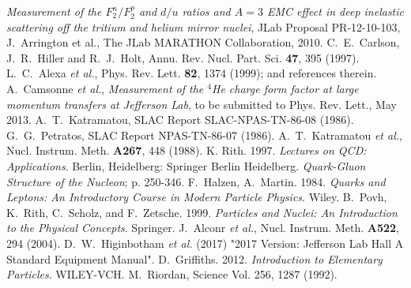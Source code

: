 

\vskip-0.6in
 {\it Measurement of the $F_2^n/F_2^p$ and $d/u$ ratios and $A=3$ EMC
effect in deep inelastic scattering off the tritium and helium mirror nuclei},
JLab Proposal PR-12-10-103, J.~Arrington et al., The JLab MARATHON Collaboration, 2010.
 C.~E.~Carlson, J.~R.~Hiller and R.~J.~Holt, Annu. Rev. Nucl.
               Part. Sci. {\bf 47}, 395 (1997).
 L.~C.~Alexa {\it et al.}, Phys. Rev. Lett. {\bf 82},
               1374 (1999); and references therein.
 A.~Camsonne {\it et al.}, {\it Measurement of the $^4$He charge
               form factor at large momentum transfers at Jefferson Lab}, to be
               submitted to Phys. Rev. Lett., May 2013.
 A.~T.~Katramatou, SLAC Report SLAC-NPAS-TN-86-08 (1986).      
 G.~G.~Petratos, SLAC Report NPAS-TN-86-07 (1986).
 A.~T.~Katramatou {\it et al.},
               Nucl. Instrum. Meth. {\bf A267}, 448 (1988).
 K. Rith. 1997. \textit{Lectures on QCD: Applications}. Berlin, Heidelberg: Springer Berlin Heidelberg. \textit{Quark-Gluon Structure of the Nucleon}; p. 250-346.
 F.~Halzen, A.~Martin. 1984. \textit{Quarks and Leptons: An Introductory Course in Modern Particle Physics}. Wiley.
 B.~Povh, K.~Rith, C.~Scholz, and F.~Zetsche. 1999. \textit{Particles and Nuclei: An Introduction to the Physical Concepts}. Springer.
 J.~Alconr {\it et al.}, Nucl. Instrum. Meth. {\bf A522}, 294 (2004).
 D.~W.~Higinbotham {\it et al.} (2017) "2017 Version: Jefferson Lab Hall A
Standard Equipment Manual".
 D.~Griffiths. 2012. \textit{Introduction to Elementary Particles}. WILEY-VCH.
 M.~Riordan, Science Vol. 256, 1287 (1992). 
               

         
               



